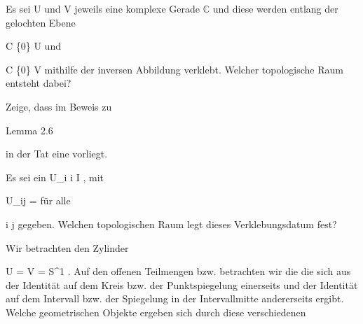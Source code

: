 {}
{





Es sei
\mathkor {} {U} {und} {V} {}
jeweils eine komplexe Gerade ${\mathbb C}$
 {} {}
und diese werden entlang der gelochten Ebene

\mavergleichskette
{\vergleichskette
{ {\mathbb C}  \setminus \{0\}
}
{ \subseteq }{ U
}
{  }{
}
{    }{
}
{   }{
}
}
{}{}{}
und

\mavergleichskette
{\vergleichskette
{ {\mathbb C}  \setminus \{0\}
}
{ \subseteq }{ V
}
{  }{
}
{    }{
}
{   }{
}
}
{}{}{}
mithilfe der inversen Abbildung
 verklebt. Welcher topologische Raum entsteht dabei?





}
{} {}

{}
{





Zeige, dass im Beweis zu

Lemma 2.6

in der Tat eine
vorliegt.





}
{} {}

{}
{





Es sei ein
\mathkor {} {U_i} {} {i \in I} {,}
mit

\mavergleichskette
{\vergleichskette
{U_{ij}
}
{ = }{ \emptyset
}
{  }{
}
{    }{
}
{   }{
}
}
{}{}{}
für alle

\mavergleichskette
{\vergleichskette
{i
}
{ \neq }{j
}
{  }{
}
{    }{
}
{   }{
}
}
{}{}{}
gegeben. Welchen topologischen Raum legt dieses Verklebungsdatum fest?





}
{} {}

{}
{





Wir betrachten den Zylinder

\mavergleichskettedisp
{\vergleichskette
{U
}
{ =} { V
}
{ =} { S^1 \times {]0,3[}
}
{ } {
}
{ } {
}
}
{}{}{.}
Auf den offenen Teilmengen
\mathl{S^1 \times {]0,1[}}{} bzw.
\mathl{S^1 \times {]2,3[}}{}
 {} {}
betrachten wir die
die sich aus der Identität auf dem Kreis bzw. der Punktspiegelung einerseits und der Identität auf dem Intervall bzw. der Spiegelung in der Intervallmitte andererseits ergibt. Welche geometrischen Objekte ergeben sich durch diese verschiedenen





}
{} {}

